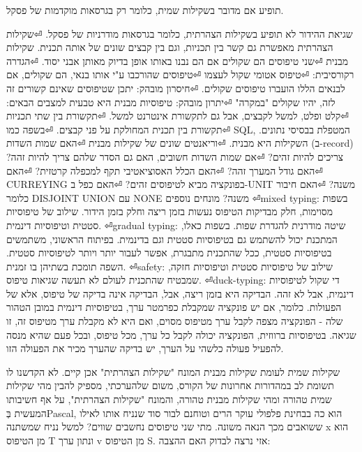      תופיע אם מדובר בשקילות שמית, כלומר רק בגרסאות מוקדמות של פסקל.
      \begin{ציינון}
\item שגיאת ההידור לא תופיע בשקילות הצהרתית, כלומר בגרסאות מודרניות של פסקל.
⏎שקילות הצהרתית מאפשרת גם קשר בין תכניות, וגם בין קבצים שונים של אותה תכנית.
      שקילות מבנית
⏎שני טיפוסים הם שקולים אם הם נבנו באותו אופן בדיוק מאותן אבני יסוד.
⏎הגדרה רקורסיבית:
⏎טיפוס אטומי שקול לעצמו
⏎טיפוסים שהורכבו ע"י אותו בנאי, הם שקולים, אם לבנאים הללו הועברו טיפוסים שקולים.
⏎חיסרון מובהק: יתכן שטיפוסים שאינם קשורים זה לזה, יהיו שקולים "במקרה"
⏎יתרון מובהק: טיפוסיות מבנית היא טבעית למצבים הבאים:
⏎קלט ופלט, למשל לקבצים, אבל גם לתקשורת אינטרנט למשל.
⏎תקשורת בין שתי תכניות
⏎תקשורת בין תכנית המחולקת על פני קבצים.
⏎בשפה כמו SQL, המטפלת בבסיסי נתונים. השקילות היא מבנית.
⏎וריאנטים שונים של שקילות מבנית
⏎האם שמות השדות (ב-record) צריכים להיות זהים?
⏎אם שמות השדות חשובים, האם גם הסדר שלהם צריך להיות זהה?
⏎האם גודל המערך זהה?
⏎האם הכלל האסוציאטיבי תקף למכפלה קרטזית?
⏎האם CURREYING בפונקציה מביא לטיפוסים זהים?
⏎האם כפל ב-UNIT משנה?
⏎האם חיבור כלומר DISJOINT UNION עם NONE משנה?
      מונחים נוספים
⏎mixed typing: בשפות מסוימות, חלק מבדיקות הטיפוס נעשות בזמן ריצה וחלק בזמן הידור. שילוב של טיפוסיות סטטית וטיפוסיות דינמית.
⏎gradual typing: שיטה מודרנית להגדרת שפות. בשפות כאלו, המתכנת יכול להשתמש גם בטיפוסיות סטטית וגם בדינמית. בפיתוח הראשוני, משתמשים בטיפוסיות סטטית, ככל שהתכנית מתבגרת, אפשר לעבור יותר ויותר לטיפוסיות סטטית. השפה תומכת בשתיהן בו זמנית.
⏎safety: שילוב של טיפוסיות סטטית וטיפוסיות חזקה, שמבטיח שהתכנית לעולם לא תעשה שגיאות טיפוס.
⏎duck-typing: די שקול לטיפוסיות דינמית, אבל לא זהה. הבדיקה היא בזמן ריצה, אבל, הבדיקה אינה בדיקה של טיפוס, אלא של הפעולות. כלומר, אם יש פונקציה שמקבלת כפרמטר ערך, בטיפוסיות דינמית במובן הטהור שלה - הפונקציה מצפה לקבל ערך מטיפוס מסוים, ואם היא לא מקבלת ערך מטיפוס זה, זו שגיאה. בטיפוסיות ברווזית, הפונקציה יכולה לקבל כל ערך, מכל טיפוס, ובכל פעם שהיא מנסה להפעיל פעולה כלשהי על הערך, יש בדיקה שהערך מכיר את הפעולה הזו.
    \end{ציינון}

      שקילות שמית לעומת שקילות מבנית
      המונח "שקילות הצהרתית" אכן קיים. לא הקדשנו לו תשומת לב במהדורות אחרונות של הקורס, משום שלהערכתי, מספיק להבין מהי שקילות שמית טהורה ומהי שקילות מבנית טהורה, והמונח "שקילות הצהרתית", על אף חשיבותו המעשית בְּPascal, הוא כה בבחינת פלפולי עוקר הרים וטוחנם לבור סוד שנניח אותו לאילו ששואבים מכך הנאה משונה.
      מתי שני טיפוסים נחשבים שווים? למשל נניח שמשתנה x הוא מן הטיפוס T ונתון ערך v מן הטיפוס S. אזי נרצה לבדוק האם ההצבה:

